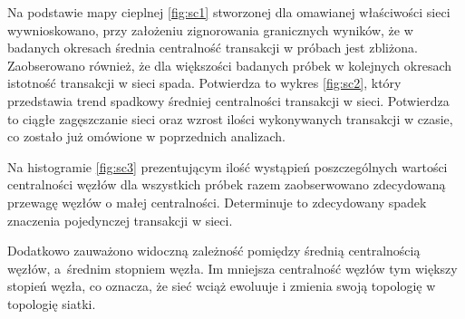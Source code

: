 \documentclass[12pt, twoside, final, openany]{mgr}
\begin{document}
\indent Na podstawie mapy cieplnej \ref{fig:sc1} stworzonej dla omawianej właściwości sieci wywnioskowano, przy założeniu zignorowania granicznych wyników, że w badanych okresach średnia centralność transakcji w próbach jest zbliżona. Zaobserowano również, że dla większości badanych próbek w kolejnych okresach istotność transakcji w sieci spada. Potwierdza to wykres \ref{fig:sc2}, który przedstawia trend spadkowy średniej centralności transakcji w sieci. Potwierdza to ciągłe zagęszczanie sieci oraz wzrost ilości wykonywanych transakcji w czasie, co zostało już omówione w poprzednich analizach.

\indent Na histogramie \ref{fig:sc3} prezentującym ilość wystąpień poszczególnych wartości centralności węzłów dla wszystkich próbek razem zaobserwowano zdecydowaną przewagę węzłów o małej centralności. Determinuje to zdecydowany spadek znaczenia pojedynczej transakcji w sieci.

\indent Dodatkowo zauważono widoczną zależność pomiędzy średnią centralnością węzłów, a~średnim stopniem węzła. Im mniejsza centralność węzłów tym większy stopień węzła, co oznacza, że sieć wciąż ewoluuje i zmienia swoją topologię w topologię siatki. 
\end{document}

